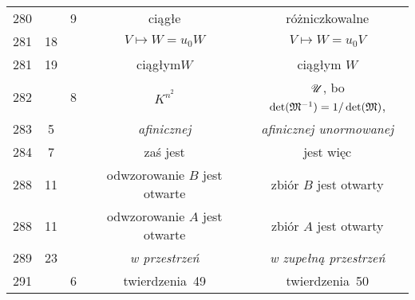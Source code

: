 \documentclass[a4paper,11pt]{article}
\begin{document}
\begin{center}
\begin{tabular}{|c|c|c|c|c|}
    280 & &  9 & ciągłe & różniczkowalne \\
    281 & 18 & & $V \mapsto W = u_{ 0 } W$ & $V \mapsto W = u_{ 0 } V$ \\
    281 & 19 & & ciągłym$W$ & ciągłym $W$ \\
    282 & &  8 & $K^{ n^{ 2 } }$
           & $\mathcal{U}$, bo $\det( \mathfrak{M}^{ -1 } ) = 1 / \det( \mathfrak{M} )$, \\
    283 &  5 & & \textit{afinicznej} & \textit{afinicznej unormowanej} \\
    284 &  7 & & zaś jest & jest więc \\
    288 & 11 & & odwzorowanie $B$ jest otwarte & zbiór $B$ jest otwarty \\
    288 & 11 & & odwzorowanie $A$ jest otwarte & zbiór $A$ jest otwarty \\
    289 & 23 & & \textit{w przestrzeń} & \textit{w zupełną przestrzeń} \\
    291 & &  6 & twierdzenia~49 & twierdzenia~50 \\
    \hline
  \end{tabular}

\end{center}
\end{document}
